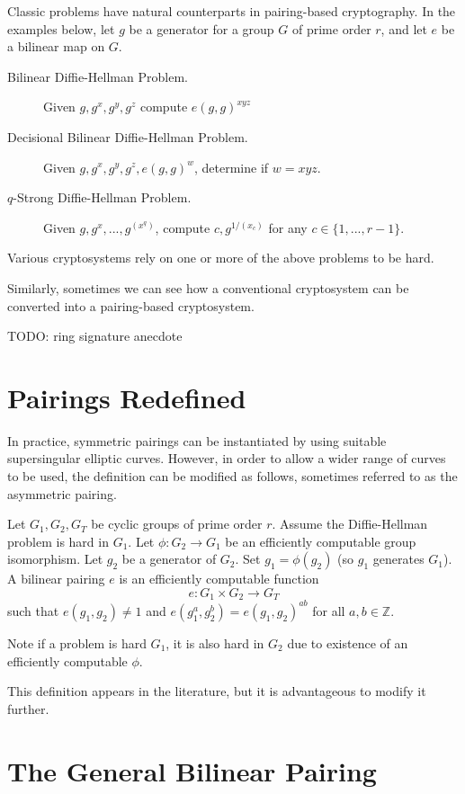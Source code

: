 Classic problems have natural counterparts in pairing-based
cryptography. In the examples below, let $g$ be a generator
for a group $G$ of prime order $r$, and let $e$ be a bilinear map
on $G$.

\begin{description}
\item [Bilinear Diffie-Hellman Problem.]
Given $g,g^x,g^y,g^z$ compute $e(g,g)^{xyz}$
\item [Decisional Bilinear Diffie-Hellman Problem.]
Given $g,g^x,g^y,g^z,e(g,g)^w$, determine if $w = x y z$.
\item [$q$-Strong Diffie-Hellman Problem.]
Given $g,g^x,...,g^{(x^q)}$, compute $c, g^{1/(x_c)}$
for any $c\in\{1,...,r-1\}$.
\end{description}

Various cryptosystems rely on one or more of the above problems to be
hard.

Similarly, sometimes we can see how a conventional cryptosystem
can be converted into a pairing-based cryptosystem.

TODO: ring signature anecdote

\section{Pairings Redefined}

In practice, symmetric pairings can be instantiated by
using suitable supersingular elliptic curves.
However, in order to allow a wider range of curves to be used,
the definition can be modified as follows, sometimes referred
to as the asymmetric pairing.

Let $G_1, G_2, G_T$ be cyclic groups of prime order $r$.
Assume the Diffie-Hellman problem is hard in $G_1$.
Let $\phi : G_2 \rightarrow G_1$ be an efficiently computable group
isomorphism. Let $g_2$ be a generator of $G_2$.
Set $g_1 = \phi(g_2)$ (so $g_1$ generates $G_1$). 
A bilinear pairing $e$ is an efficiently computable function
\[
e:G_1 \times G_2 \rightarrow G_T
\]
such that $e(g_1,g_2) \ne 1$ and
$e(g_1^a, g_2^b) = e(g_1,g_2)^{a b}$ for all $a, b \in \mathbb{Z}$.

Note if a problem is hard $G_1$, it is also hard in $G_2$
due to existence of an efficiently computable
$\phi$.

This definition appears in the literature, but it is advantageous
to modify it further.

\section{The General Bilinear Pairing}

